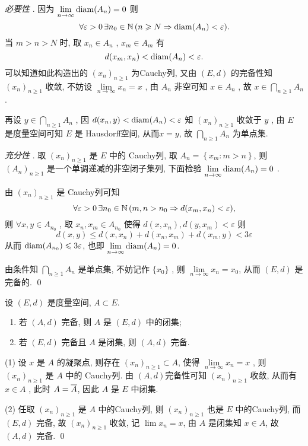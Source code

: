      \begin{Proof}
          \textsl{必要性} . 因为 $ \lim\limits_{n\to\infty}\diam(A_{n})=0 $ 则
          \[
               \forall \varepsilon>0\,\exists n_{0}\in\N\,(n\geqslant N\Rightarrow \diam(A_{n})<\varepsilon). 
          \]
          当 $ m>n>N $ 时, 取 $ x_{n}\in A_{n} $ , $ x_{m}\in A_{m} $ 有
          \[
               d(x_{m}, x_{n})<\diam(A_{n})<\varepsilon. 
          \]
          可以知道如此构造出的 $ (x_{n})_{n\geqslant1} $ 为Cauchy列, 又由 $ (E, d) $ 的完备性知 $ (x_{n})_{n\geqslant1} $ 收敛, 不妨设 $\lim\limits_{n\to\infty}x_{n}=x$ , 由 $ A_{n} $ 非空可知 $ x\in A_{n} $ , 故 $ x\in\bigcap\limits_{n\geqslant1}A_{n} $ . 

          再设 $ y\in\bigcap\limits_{n\geqslant1} A_{n} $ , 因 $ d(x_{n}, y)<\diam(A_{n})<\varepsilon $ 知 $ (x_{n})_{n\geqslant1} $ 收敛于 $ y $ , 由 $ E $ 是度量空间可知 $ E $ 是 Hausdorff空间, 从而$ x=y $, 故 $ \bigcap\limits_{n\geqslant1} A_{n} $ 为单点集. 

          \textsl{充分性} . 取 $ (x_{n})_{n\geqslant1} $ 是 $ E $ 中的 Cauchy列, 取 $ A_{n}=\left\{ x_{m}:m>n \right\} $, 则 $ (A_{n})_{n\geqslant1} $ 是一个单调递减的非空闭子集列, 下面检验 $ \lim\limits_{n\to\infty}\diam(A_{n})=0 $ . 

          由 $ (x_{n})_{n\geqslant1} $ 是 Cauchy列可知
          \[
               \forall \varepsilon>0\, \exists n_{0}\in\N\,(m, n>n_{0}\Rightarrow d(x_{m}, x_{n})<\varepsilon),
          \]
          则 $ \forall x, y\in A_{n_{0}} $ , 取 $ x_{n}, x_{m}\in A_{n_{0}} $ 使得 $ d(x, x_{n}), d(y, x_{m})<\varepsilon $ 则
          \[
               d(x, y)\leqslant d(x, x_{n})+d(x_{n}, x_{m})+d(x_{m}, y) < 3\varepsilon         
          \]
          从而 $ \diam(A_{n_{0}})\leqslant3\varepsilon $, 也即 $\lim\limits_{n\to\infty} \diam(A_{n})=0 $. 

          由条件知 $ \bigcap\limits_{n\geqslant1}A_{n} $ 是单点集, 不妨记作 $ \{ x_{0} \} $ , 则 $ \lim\limits_{n\to\infty}x_{n}=x_{0} $, 从而 $ (E, d) $  是完备的. \qed
     \end{Proof}
     \begin{Theorem}
          设 $ (E, d) $ 是度量空间, $ A\subset E $. 
          \begin{enumerate}[(1)]
               \item 若 $ (A, d) $ 完备, 则 $ A $ 是 $ (E, d) $ 中的闭集;
               \item 若 $ (E, d) $ 完备且 $ A $ 是闭集, 则 $ (A, d) $ 完备. 
          \end{enumerate} 
     \end{Theorem}
     \begin{Proof}
          (1) 设 $ x $ 是 $ A $ 的凝聚点, 则存在 $ (x_{n})_{n\geqslant1}\subset A $, 使得 $ \lim\limits_{n\to\infty}x_{n}=x $ , 则 $ (x_{n})_{n\geqslant1} $ 是 $ A $ 中的 Cauchy列. 由 $ (A, d) $完备性可知 $ (x_{n})_{n\geqslant1} $ 收敛, 从而有 $ x\in A $ , 此时 $ A=\baro{A} $, 因此 $ A $ 是 $ E $ 中闭集. 

          (2) 任取 $ (x_{n})_{n\geqslant1} $ 是 $ A $ 中的Cauchy列, 则 $ (x_{n})_{n\geqslant1} $ 也是 $ E $ 中的Cauchy列, 而 $ (E, d) $ 完备, 故 $ (x_{n})_{n\geqslant1} $ 收敛, 记 $ \lim\limits x_{n}=x $, 由 $ A $ 是闭集知 $ x\in A $, 故 $ (A, d) $ 完备. \qed
     \end{Proof}
